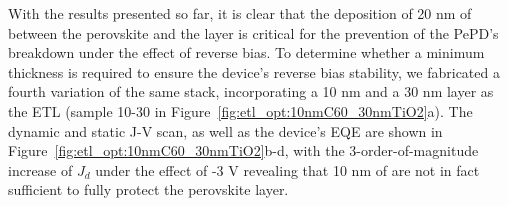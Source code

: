 With the results presented so far, it is clear that the deposition of 20 nm of  between the perovskite and the  layer is critical for the prevention of the PePD's breakdown under the effect of reverse bias. To determine whether a minimum  thickness is required to ensure the device's reverse bias stability, we fabricated a fourth variation of the same stack, incorporating a 10 nm  and a 30 nm  layer as the ETL (sample 10-30 in Figure~\ref{fig:etl_opt:10nmC60_30nmTiO2}a). The dynamic and static J-V scan, as well as the device's EQE are shown in Figure~\ref{fig:etl_opt:10nmC60_30nmTiO2}b-d, with the 3-order-of-magnitude increase of $J_d$ under the effect of -3 V revealing that 10 nm of  are not in fact sufficient to fully protect the perovskite layer.


